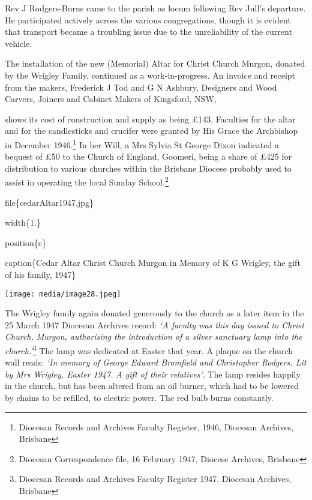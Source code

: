 Rev J Rodgers-Burns came to the parish as locum following Rev Jull's departure. He participated actively across the various congregations, though it is evident that transport became a troubling issue due to the unreliability of the current vehicle.

The installation of the new (Memorial) Altar for Christ Church Murgon, donated by the Wrigley Family, continued as a work-in-progress. An invoice and receipt from the makers, Frederick J Tod and G N Ashbury, Designers and Wood Carvers, Joiners and Cabinet Makers of Kingsford, NSW,

shows its cost of construction and supply as being £143. Faculties for the altar and for the candlesticks and crucifer were granted by His Grace the Archbishop in December 1946.\footnote{Diocesan Records and Archives Faculty Register, 1946, Diocesan Archives, Brisbane} In her Will, a Mrs Sylvia St George Dixon indicated a bequest of £50 to the Church of England, Goomeri, being a share of £425 for distribution to various churches within the Brisbane Diocese probably used to assist in operating the local Sunday School.\footnote{Diocesan Correspondence file, 16 February 1947, Diocese Archives, Brisbane}

file\{cedarAltar1947.jpg\}

width\{1.\}

position\{c\}

caption\{Cedar Altar Christ Church Murgon in Memory of K G Wrigley, the gift of his family, 1947\}

\texttt{[image: media/image28.jpeg]}

The Wrigley family again donated generously to the church as a later item in the 25 March 1947 Diocesan Archives record: \emph{`A faculty was this day issued to Christ Church, Murgon, authorising the introduction of a silver sanctuary lamp into the church.'}\footnote{Diocesan Records and Archives Faculty Register 1947, Diocesan Archives, Brisbane} The lamp was dedicated at Easter that year. A plaque on the church wall reads: \emph{`In memory of George Edward Bromfield and Christopher Rodgers. Lit by Mrs Wrigley, Easter 1947. A gift of their relatives'}. The lamp resides happily in the church, but has been altered from an oil burner, which had to be lowered by chains to be refilled, to electric power. The red bulb burns constantly.

